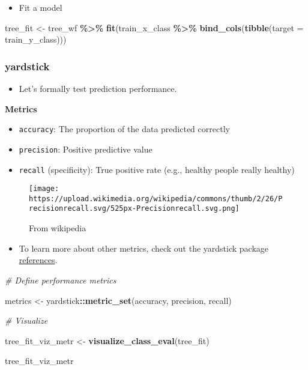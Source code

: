 \documentclass[
]{book}
\newenvironment{Shaded}{\begin{snugshade}}{\end{snugshade}}
\newcommand{\CommentTok}[1]{\textcolor[rgb]{0.56,0.35,0.01}{\textit{#1}}}
\newcommand{\DataTypeTok}[1]{\textcolor[rgb]{0.13,0.29,0.53}{#1}}
\newcommand{\KeywordTok}[1]{\textcolor[rgb]{0.13,0.29,0.53}{\textbf{#1}}}
\newcommand{\NormalTok}[1]{#1}
\newcommand{\OperatorTok}[1]{\textcolor[rgb]{0.81,0.36,0.00}{\textbf{#1}}}
\newcommand{\StringTok}[1]{\textcolor[rgb]{0.31,0.60,0.02}{#1}}
\providecommand{\tightlist}{%
  \setlength{\itemsep}{0pt}\setlength{\parskip}{0pt}}
\begin{document}
\begin{itemize}
\tightlist
\item
  Fit a model
\end{itemize}

\begin{Shaded}
\begin{Highlighting}[]
\NormalTok{tree\_fit \textless{}{-}}\StringTok{ }\NormalTok{tree\_wf }\OperatorTok{\%\textgreater{}\%}\StringTok{ }\KeywordTok{fit}\NormalTok{(train\_x\_class }\OperatorTok{\%\textgreater{}\%}\StringTok{ }\KeywordTok{bind\_cols}\NormalTok{(}\KeywordTok{tibble}\NormalTok{(}\DataTypeTok{target =}\NormalTok{ train\_y\_class)))}
\end{Highlighting}
\end{Shaded}

\hypertarget{yardstick-1}{%
\subsubsection{yardstick}\label{yardstick-1}}

\begin{itemize}
\tightlist
\item
  Let's formally test prediction performance.
\end{itemize}

\textbf{Metrics}

\begin{itemize}
\item
  \texttt{accuracy}: The proportion of the data predicted correctly
\item
  \texttt{precision}: Positive predictive value
\item
  \texttt{recall} (specificity): True positive rate (e.g., healthy people really healthy)
\end{itemize}

\begin{figure}
\centering
\texttt{[image: https://upload.wikimedia.org/wikipedia/commons/thumb/2/26/Precisionrecall.svg/525px-Precisionrecall.svg.png]}
\caption{From wikipedia}
\end{figure}

\begin{itemize}
\tightlist
\item
  To learn more about other metrics, check out the yardstick package \href{https://yardstick.tidymodels.org/reference/index.html}{references}.
\end{itemize}

\begin{Shaded}
\begin{Highlighting}[]
\CommentTok{\# Define performance metrics }

\NormalTok{metrics \textless{}{-}}\StringTok{ }\NormalTok{yardstick}\OperatorTok{::}\KeywordTok{metric\_set}\NormalTok{(accuracy, precision, recall)}

\CommentTok{\# Visualize}

\NormalTok{tree\_fit\_viz\_metr \textless{}{-}}\StringTok{ }\KeywordTok{visualize\_class\_eval}\NormalTok{(tree\_fit)}

\NormalTok{tree\_fit\_viz\_metr}
\end{Highlighting}
\end{Shaded}
\end{document}
